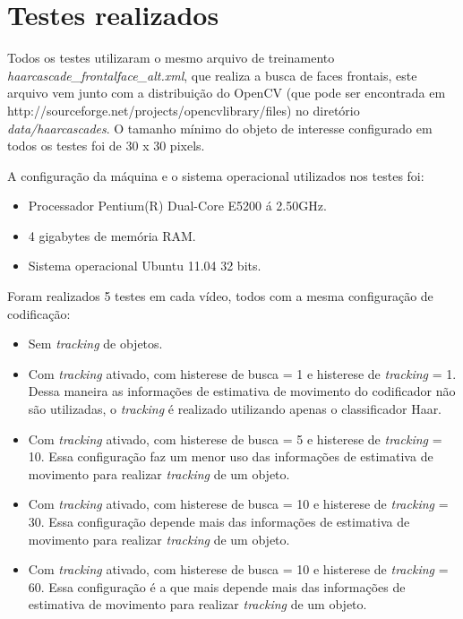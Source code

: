 \documentclass[12pt]{article}
\begin{document}
\section*{Testes realizados}
\label{art:testes}

Todos os testes utilizaram o mesmo arquivo de treinamento \textit{haarcascade\_frontalface\_alt.xml}, que realiza a busca de faces frontais, este arquivo vem junto com a distribuição do OpenCV (que pode ser encontrada em http://sourceforge.net/projects/opencvlibrary/files) no diretório \textit{data/haarcascades}. O tamanho mínimo do objeto de interesse configurado em todos os testes foi de 30 x 30 pixels.

A configuração da máquina e o sistema operacional utilizados nos testes foi:


\begin{itemize}
        \item Processador Pentium(R) Dual-Core E5200 á 2.50GHz.
        \item 4 gigabytes de memória RAM.
        \item Sistema operacional Ubuntu 11.04 32 bits.
\end{itemize}

Foram realizados 5 testes em cada vídeo, todos com a mesma configuração de codificação:

\begin{itemize}
        \item Sem \textit{tracking} de objetos.

	\item Com \textit{tracking} ativado, com histerese de busca = 1 e histerese de \textit{tracking} = 1. Dessa maneira as informações de estimativa de movimento do codificador não são utilizadas, o \textit{tracking} é realizado utilizando apenas o classificador Haar.

	\item Com \textit{tracking} ativado, com histerese de busca = 5 e histerese de \textit{tracking} = 10. Essa configuração faz um menor uso das informações de estimativa de movimento para realizar \textit{tracking} de um objeto.

         \item Com \textit{tracking} ativado, com histerese de busca = 10 e histerese de \textit{tracking} = 30. Essa configuração depende mais das informações de estimativa de movimento para realizar \textit{tracking} de um objeto.

         \item Com \textit{tracking} ativado, com histerese de busca = 10 e histerese de \textit{tracking} = 60. Essa configuração é a que mais depende mais das informações de estimativa de movimento para realizar \textit{tracking} de um objeto.
\end{itemize}
\end{document}
